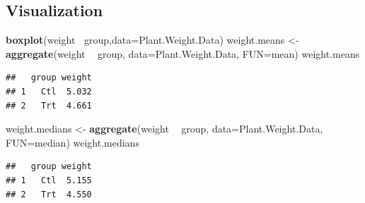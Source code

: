 \documentclass[
]{book}
\newenvironment{Shaded}{\begin{snugshade}}{\end{snugshade}}
\newcommand{\DataTypeTok}[1]{\textcolor[rgb]{0.13,0.29,0.53}{#1}}
\newcommand{\DecValTok}[1]{\textcolor[rgb]{0.00,0.00,0.81}{#1}}
\newcommand{\FloatTok}[1]{\textcolor[rgb]{0.00,0.00,0.81}{#1}}
\newcommand{\KeywordTok}[1]{\textcolor[rgb]{0.13,0.29,0.53}{\textbf{#1}}}
\newcommand{\NormalTok}[1]{#1}
\newcommand{\OperatorTok}[1]{\textcolor[rgb]{0.81,0.36,0.00}{\textbf{#1}}}
\newcommand{\StringTok}[1]{\textcolor[rgb]{0.31,0.60,0.02}{#1}}
\begin{document}
\hypertarget{visualization}{%
\subsection{Visualization}\label{visualization}}

\begin{Shaded}
\begin{Highlighting}[]
\KeywordTok{boxplot}\NormalTok{(weight}\OperatorTok{~}\StringTok{ }\NormalTok{group,}\DataTypeTok{data=}\NormalTok{Plant.Weight.Data)}
\NormalTok{weight.means <-}\StringTok{ }\KeywordTok{aggregate}\NormalTok{(weight }\OperatorTok{~}\StringTok{  }\NormalTok{group, }\DataTypeTok{data=}\NormalTok{Plant.Weight.Data, }\DataTypeTok{FUN=}\NormalTok{mean)}
\NormalTok{weight.means}
\end{Highlighting}
\end{Shaded}

\begin{verbatim}
##   group weight
## 1   Ctl  5.032
## 2   Trt  4.661
\end{verbatim}

\begin{Shaded}
\begin{Highlighting}[]
\NormalTok{weight.medians <-}\StringTok{ }\KeywordTok{aggregate}\NormalTok{(weight }\OperatorTok{~}\StringTok{  }\NormalTok{group, }\DataTypeTok{data=}\NormalTok{Plant.Weight.Data, }\DataTypeTok{FUN=}\NormalTok{median)}
\NormalTok{weight.medians}
\end{Highlighting}
\end{Shaded}

\begin{verbatim}
##   group weight
## 1   Ctl  5.155
## 2   Trt  4.550
\end{verbatim}

\begin{Shaded}
\end{Shaded}
\end{document}
